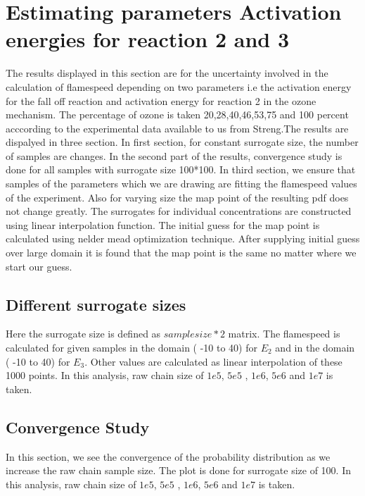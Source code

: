 \section{Estimating parameters Activation energies for reaction 2  and 3  }

The results displayed in this section are for the uncertainty involved in the calculation of flamespeed depending on two parameters i.e the activation energy for the fall off reaction and activation energy for reaction 2 in the ozone mechanism. The percentage of ozone is taken  20,28,40,46,53,75 and 100  percent acccording to the experimental data available to us from Streng\cite{Streng}.The results are dispalyed in three section. In first section, for constant surrogate size, the number of samples are changes. In the second part of the results, convergence study is done for all samples with surrogate size 100*100. In third section, we ensure that samples of the parameters which we are drawing are fitting the flamespeed values of the experiment. Also for varying size the map point of the resulting pdf does not change greatly. The surrogates for individual concentrations are constructed using linear interpolation function. The initial guess for the map point is calculated using nelder mead optimization technique. After supplying initial guess over large domain it is found that the map point is the same no matter where we start our guess. 
\bigskip

\subsection{Different surrogate sizes }

 Here the surrogate size is defined as $sample size*2$ matrix. The flamespeed is calculated for given samples in the domain ( -10 to 40) for $E_2$ and in the domain ( -10 to 40) for $E_3$. Other values are calculated as linear interpolation of these 1000 points. In this analysis, raw chain size of $1e5$, $5e5$ , $1e6$, $5e6$ and $1e7$ is taken. 







\subsection{Convergence Study }

 In this section, we see the convergence of the probability distribution as we increase the raw chain sample size. The plot is done for surrogate size of 100. In this analysis, raw chain size of $1e5$, $5e5$ , $1e6$, $5e6$ and $1e7$ is taken. 

